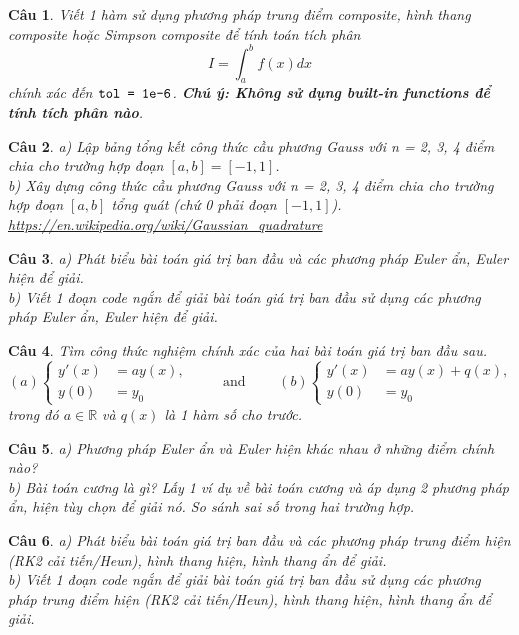 \documentclass[11pt]{article}
\newtheorem{bt}{Câu}
\begin{document}
\begin{bt}\label{lt7}
Viết 1 hàm sử dụng phương pháp trung điểm composite, hình thang composite hoặc Simpson composite để tính toán tích phân 
%
\[
I = \int_a^b f(x)dx
\]
%
chính xác đến $\verb|tol = 1e-6|$. \textbf{Chú ý: Không sử dụng built-in functions để tính tích phân nào}.
\end{bt}

\begin{bt}\label{lt8}
a) Lập bảng tổng kết công thức cầu phương Gauss với n = 2, 3, 4 điểm chia cho trường hợp đoạn $[a,b] = [-1,1]$. \\
b) Xây dựng công thức cầu phương Gauss với n = 2, 3, 4 điểm chia cho trường hợp đoạn $[a,b]$ tổng quát (chứ 0 phải đoạn $[-1,1]$).  \\
\url{https://en.wikipedia.org/wiki/Gaussian_quadrature}
\end{bt}

\begin{bt}\label{lt9}
a) Phát biểu bài toán giá trị ban đầu và các phương pháp Euler ẩn, Euler hiện để giải. \\
b) Viết 1 đoạn code ngắn để giải bài toán giá trị ban đầu sử dụng các phương pháp Euler ẩn, Euler hiện để giải.
\end{bt}

\begin{bt}\label{lt10}
Tìm công thức nghiệm chính xác của hai bài toán giá trị ban đầu sau.
\begin{equation*}
	(a) 
	\begin{cases}
	y'(x) &= a y(x), \\
	y(0) &= y_0 
	\end{cases}
 \qquad \mbox{ and } \qquad 
 	(b) 
 \begin{cases}
 	y'(x) &= a y(x) + q(x), \\
 	y(0) &= y_0 
 \end{cases}
\end{equation*}
%
trong đó $a \in \mathbb{R}$ và $q(x)$ là 1 hàm số cho trước.
\end{bt}

\begin{bt}\label{lt11}
a) Phương pháp Euler ẩn và Euler hiện khác nhau ở những điểm chính nào? \\
b) Bài toán cương là gì? Lấy 1 ví dụ về bài toán cương và áp dụng 2 phương pháp ẩn, hiện tùy chọn để giải nó. So sánh sai số trong hai trường hợp. 
\end{bt}

\begin{bt}\label{lt12}
a) Phát biểu bài toán giá trị ban đầu và các phương pháp trung điểm hiện (RK2 cải tiến/Heun), hình thang hiện, hình thang ẩn để giải. \\
b) Viết 1 đoạn code ngắn để giải bài toán giá trị ban đầu sử dụng các phương pháp trung điểm hiện (RK2 cải tiến/Heun), hình thang hiện, hình thang ẩn để giải.
\end{bt}
\end{document}
